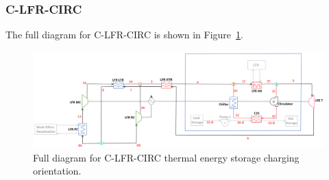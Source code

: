 \documentclass[sustainability,article,accept,moreauthors,pdftex]{Definitions/mdpi}
\begin{document}
\begin{paracol}{2}
\switchcolumn

\vspace{-6pt}
\subsubsection{C-LFR-CIRC} 

The full diagram for C-LFR-CIRC is shown in Figure~\ref{c-lfr-circ}.
\end{paracol}
\begin{figure}[H]
    \widefigure
    \includegraphics[width=\linewidth]{Definitions/c-lfr-circ.pdf}
    \caption{Full diagram for C-LFR-CIRC thermal energy storage charging orientation\label{c-lfr-circ}.}
\end{figure}
\end{document}
